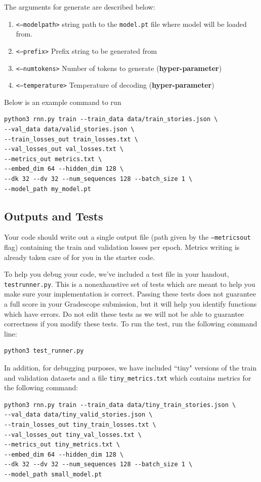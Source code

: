 \documentclass[11pt,addpoints,answers]{exam}
\begin{document}
The arguments for generate are described below:
\begin{enumerate}
    \item \texttt{<--model\textunderscore path>} string path to the \texttt{model.pt} file where model will be loaded from.
    \item \texttt{<--prefix>} Prefix string to be generated from
    \item \texttt{<--num\textunderscore tokens>} Number of tokens to generate (\textbf{hyper-parameter})
    \item \texttt{<--temperature>} Temperature of decoding (\textbf{hyper-parameter})
\end{enumerate}
Below is an example command to run

\begin{lstlisting}
python3 rnn.py train --train_data data/train_stories.json \
--val_data data/valid_stories.json \
--train_losses_out train_losses.txt \ 
--val_losses_out val_losses.txt \
--metrics_out metrics.txt \
--embed_dim 64 --hidden_dim 128 \
--dk 32 --dv 32 --num_sequences 128 --batch_size 1 \
--model_path my_model.pt
\end{lstlisting}
\vspace{0.2 in}

\subsection{Outputs and Tests} 
Your code should write out a single output file (path given by the \texttt{--metrics\textunderscore out} flag) containing the train and validation losses per epoch. Metrics writing is already taken care of for you in the starter code.

To help you debug your code, we’ve included a test file in your handout, \texttt{test\textunderscore runner.py}. This is a nonexhaustive set of tests which are meant to help you make sure your implementation is correct. Passing these tests does not guarantee a full score in your Gradescope submission, but it will help you identify functions which have errors. Do not edit these tests as we will not be able to guarantee correctness if you modify these tests. To run the test, run the following command line:
\begin{lstlisting}[language=Shell]
python3 test_runner.py
\end{lstlisting}

In addition, for debugging purposes, we have included ``tiny" versions of the train and validation datasets and a file \texttt{tiny\_metrics.txt} which contains metrics for the following command:
\begin{lstlisting}
python3 rnn.py train --train_data data/tiny_train_stories.json \
--val_data data/tiny_valid_stories.json \
--train_losses_out tiny_train_losses.txt \ 
--val_losses_out tiny_val_losses.txt \
--metrics_out tiny_metrics.txt \
--embed_dim 64 --hidden_dim 128 \
--dk 32 --dv 32 --num_sequences 128 --batch_size 1 \
--model_path small_model.pt
\end{lstlisting}
\end{document}
